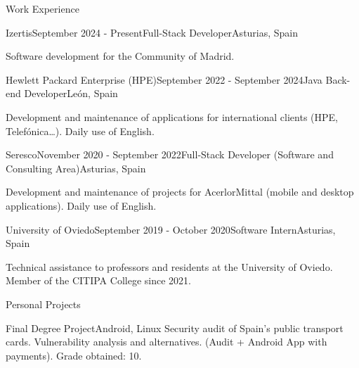 \documentclass{resume} %
\begin{document}
\begin{rSection}{Work Experience}


\begin{rSubsection}{Izertis}{September 2024 - Present}{Full-Stack Developer}{Asturias, Spain}
\item Software development for the Community of Madrid.
\end{rSubsection}

\begin{rSubsection}{Hewlett Packard Enterprise (HPE)}{September 2022 - September 2024}{Java Back-end Developer}{León, Spain}
\item Development and maintenance of applications for international clients (HPE, Telefónica…). Daily use of English.
\end{rSubsection}

\begin{rSubsection}{Seresco}{November 2020 - September 2022}{Full-Stack Developer (Software and Consulting Area)}{Asturias, Spain}
\item Development and maintenance of projects for AcerlorMittal (mobile and desktop applications). Daily use of English.
\end{rSubsection}

\begin{rSubsection}{University of Oviedo}{September 2019 - October 2020}{Software Intern}{Asturias, Spain}
\item Technical assistance to professors and residents at the University of Oviedo. Member of the CITIPA College since 2021.
\end{rSubsection}

\end{rSection}


\begin{rSection}{Personal Projects}
\begin{rSubsection}{{Final Degree Project}}{Android, Linux}{}{}
Security audit of Spain's public transport cards. Vulnerability analysis and alternatives. (Audit + Android App with payments).
Grade obtained: 10.
\end{rSubsection}
\end{rSection}
\end{document}
